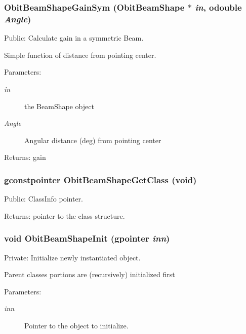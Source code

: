 \subsubsection{ Obit\-Beam\-Shape\-Gain\-Sym ({\bf Obit\-Beam\-Shape} $\ast$ {\em in}, {\bf odouble} {\em Angle})}\label{ObitBeamShape_8c_a12}


Public: Calculate gain in a symmetric Beam. 

Simple function of distance from pointing center. \begin{Desc}
\item[Parameters:]
\begin{description}
\item[{\em in}]the Beam\-Shape object \item[{\em Angle}]Angular distance (deg) from pointing center \end{description}
\end{Desc}
\begin{Desc}
\item[Returns:]gain \end{Desc}
\subsubsection{\setlength{\rightskip}{0pt plus 5cm}gconstpointer Obit\-Beam\-Shape\-Get\-Class (void)}\label{ObitBeamShape_8c_a7}


Public: Class\-Info pointer. 

\begin{Desc}
\item[Returns:]pointer to the class structure. \end{Desc}
\subsubsection{\setlength{\rightskip}{0pt plus 5cm}void Obit\-Beam\-Shape\-Init (gpointer {\em inn})}\label{ObitBeamShape_8c_a3}


Private: Initialize newly instantiated object. 

Parent classes portions are (recursively) initialized first \begin{Desc}
\item[Parameters:]
\begin{description}
\item[{\em inn}]Pointer to the object to initialize. \end{description}
\end{Desc}
